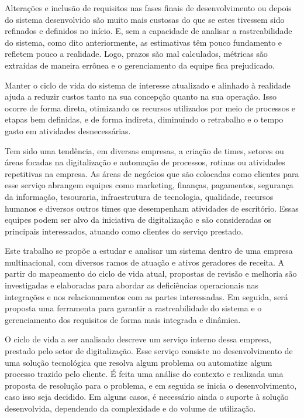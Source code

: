 	Alterações e inclusão de requisitos nas fases finais de desenvolvimento ou depois 
	do sistema desenvolvido são muito mais custosas do que se estes tivessem sido 
	refinados e definidos no início. E, sem a capacidade de analisar a rastreabilidade do 
	sistema, como dito anteriormente, as estimativas têm pouco fundamento e 
	refletem pouco a realidade. Logo, prazos são mal calculados, métricas são extraídas 
	de maneira errônea e o gerenciamento da equipe fica prejudicado. 

	Manter o ciclo de vida do sistema de interesse atualizado e alinhado à realidade 
	ajuda a reduzir custos tanto na sua concepção quanto na sua operação. Isso ocorre 
	de forma direta, otimizando os recursos utilizados por meio de processos e etapas bem 
	definidas, e de forma indireta, diminuindo o retrabalho e o tempo gasto em atividades desnecessárias.

	Tem sido uma tendência, em diversas empresas, a criação de times, setores ou áreas focadas na digitalização 
	e automação de processos, rotinas ou atividades repetitivas na empresa.
	As áreas de negócios que são colocadas como clientes para esse serviço abrangem equipes 
	como marketing, finanças, pagamentos, segurança da informação, tesouraria, infraestrutura de tecnologia, 
	qualidade, recursos humanos e diversos outros times que desempenham atividades de escritório. Essas equipes 
	podem ser alvo da iniciativa de digitalização e são consideradas os principais interessados, atuando como 
	clientes do serviço prestado.

	Este trabalho se propõe a estudar e analisar um sistema dentro de uma empresa multinacional, com 
	diversos ramos de atuação e ativos geradores de receita. A partir do mapeamento do ciclo de vida 
	atual, propostas de revisão e melhoria são investigadas e elaboradas para abordar as deficiências 
	operacionais nas integrações e nos relacionamentos com as partes interessadas. Em seguida, será proposta 
	uma ferramenta para garantir a rastreabilidade do sistema e o gerenciamento dos requisitos de forma 
	mais integrada e dinâmica.

	O ciclo de vida a ser analisado descreve um serviço interno dessa empresa, prestado pelo setor de digitalização.
	Esse serviço consiste no desenvolvimento de uma solução tecnológica que resolva algum problema ou automatize algum processo trazido pelo 
	cliente. É feita uma análise do contexto e realizada uma proposta de resolução 
	para o problema, e em seguida se inicia o desenvolvimento, caso isso seja decidido. 
	Em alguns casos, é necessário ainda o suporte à solução desenvolvida, dependendo 
	da complexidade e do volume de utilização. 

